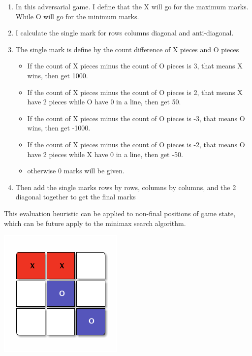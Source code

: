 \documentclass[titlepage]{article}
\begin{document}
\begin{enumerate}
\item In this adversarial game. I define that the X will go for the maximum
marks. While O will go for the minimum marks.
\item I calculate the single mark for rows columns diagonal and anti-diagonal.
\item The single mark is define by the count difference of X pieces and O pieces
\begin{itemize}
\item If the count of X pieces minus the count of O pieces is 3, that means X wins, then get 1000.
\item If the count of X pieces minus the count of O pieces is 2, that means X
have 2 pieces while O have 0 in a line, then get 50.
\item If the count of X pieces minus the count of O pieces is -3, that means O wins, then get -1000.
\item If the count of X pieces minus the count of O pieces is -2, that means O
have 2 pieces while X have 0 in a line, then get -50.
\item otherwise 0 marks will be given.
\end{itemize}
\item Then add the single marks rows by rows, columns by columns, and the 2
diagonal together to get the final marks
\end{enumerate}

This evaluation heuristic can be applied to non-final positions of game state,
which can be future apply to the minimax search algorithm.

\begin{center}
\includegraphics[width=.9\linewidth]{d.png}
\end{center}
\end{document}
